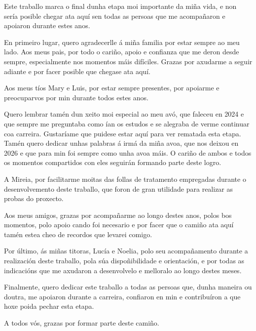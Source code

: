 \documentclass[11pt,a4paper,titlepage,oneside]{report}
\begin{document}

 
 \paxinaenbranco

\begin{agradecementos}

Este traballo marca o final dunha etapa moi importante da miña vida, e non sería posible chegar ata aquí sen todas as persoas que me acompañaron e apoiaron durante estes anos.

En primeiro lugar, quero agradecerlle á miña familia por estar sempre ao meu lado. Aos meus pais, por todo o cariño, apoio e confianza que me deron desde sempre, especialmente nos momentos máis difíciles. Grazas por axudarme a seguir adiante e por facer posible que chegase ata aquí.

Aos meus tíos Mary e Luis, por estar sempre presentes, por apoiarme e preocuparvos por min durante todos estes anos.

Quero lembrar tamén dun xeito moi especial ao meu avó, que faleceu en 2024 e que sempre me preguntaba como ían os estudos e se alegraba de verme continuar coa carreira. Gustaríame que puidese estar aquí para ver rematada esta etapa. Tamén quero dedicar unhas palabras á irmá da miña avoa, que nos deixou en 2026 e que para min foi sempre como unha avoa máis. O cariño de ambos e todos os momentos compartidos con eles seguirán formando parte deste logro.

A Mireia, por facilitarme moitas das follas de tratamento empregadas durante o desenvolvemento deste traballo, que foron de gran utilidade para realizar as probas do proxecto.

Aos meus amigos, grazas por acompañarme ao longo destes anos, polos bos momentos, polo apoio cando foi necesario e por facer que o camiño ata aquí tamén estea cheo de recordos que levarei comigo.

Por último, ás miñas titoras, Lucía e Noelia, polo seu acompañamento durante a realización deste traballo, pola súa dispoñibilidade e orientación, e por todas as indicacións que me axudaron a desenvolvelo e melloralo ao longo destes meses.

Finalmente, quero dedicar este traballo a todas as persoas que, dunha maneira ou doutra, me apoiaron durante a carreira, confiaron en min e contribuíron a que hoxe poida pechar esta etapa.

A todos vós, grazas por formar parte deste camiño.


\end{agradecementos}
\end{document}
